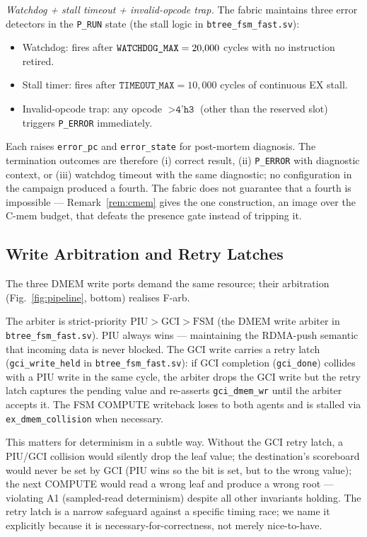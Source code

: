 \documentclass[journal,10pt]{IEEEtran}
\theoremstyle{plain}
\theoremstyle{definition}
\theoremstyle{remark}
\newcommand{\sv}[1]{\texttt{#1}}
\begin{document}
\emph{Watchdog + stall timeout + invalid-opcode trap.} The fabric
maintains three error detectors in the \texttt{P\_RUN} state
(the stall logic in \sv{btree\_fsm\_fast.sv}):

\begin{itemize}
\item Watchdog: fires after $\sv{WATCHDOG\_MAX} = \WatchdogMax$ cycles with
  no instruction retired.
\item Stall timer: fires after $\sv{TIMEOUT\_MAX} = 10{,}000$ cycles of
  continuous EX stall.
\item Invalid-opcode trap: any opcode $> \sv{4'h3}$ (other than the
  reserved slot) triggers \texttt{P\_ERROR} immediately.
\end{itemize}
Each raises \texttt{error\_pc} and \texttt{error\_state} for post-mortem
diagnosis. The termination outcomes are therefore (i) correct result,
(ii) \texttt{P\_ERROR} with diagnostic context, or (iii) watchdog timeout
with the same diagnostic; no configuration in the campaign produced a
fourth. The fabric does not guarantee that a fourth is impossible ---
Remark~\ref{rem:cmem} gives the one construction, an image over the
\textsf{C-mem} budget, that defeats the presence gate instead of tripping
it.

\subsection{Write Arbitration and Retry Latches}\label{sec:write-arb}

The three DMEM write ports demand the same resource; their arbitration
(Fig.~\ref{fig:pipeline}, bottom) realises \textsf{F-arb}.

The arbiter is strict-priority $\mathrm{PIU} > \mathrm{GCI} >
\mathrm{FSM}$ (the DMEM write arbiter in \sv{btree\_fsm\_fast.sv}). PIU always wins ---
maintaining the RDMA-push semantic that incoming data is never
blocked. The GCI write carries a retry latch
(\sv{gci\_write\_held} in \sv{btree\_fsm\_fast.sv}):
if GCI completion (\texttt{gci\_done}) collides with a PIU write in the
same cycle, the arbiter drops the GCI write but the retry latch captures
the pending value and re-asserts \texttt{gci\_dmem\_wr} until the arbiter
accepts it. The FSM COMPUTE writeback loses to both agents and is
stalled via \texttt{ex\_dmem\_collision} when necessary.

This matters for determinism in a subtle way. Without the GCI retry
latch, a PIU/GCI collision would silently drop the leaf value; the
destination's scoreboard would never be set by GCI (PIU wins so the bit
is set, but to the wrong value); the next COMPUTE would read a wrong leaf
and produce a wrong root --- violating A1 (sampled-read determinism)
despite all other invariants holding. The retry latch is a narrow
safeguard against a specific timing race; we name it explicitly because
it is necessary-for-correctness, not merely nice-to-have.
\end{document}
